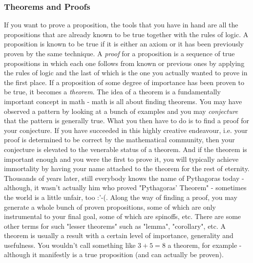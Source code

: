 \subsubsection{Theorems and Proofs}
If you want to prove a proposition, the tools that you have in hand are all the propositions that are already known to be true together with the rules of logic. A proposition is known to be true if it is either an axiom or it has been previously proven by the same technique. A \emph{proof} for a proposition is a sequence of true propositions in which each one follows from known or previous ones by applying the rules of logic and the last of which is the one you actually wanted to prove in the first place. If a proposition of some degree of importance has been proven to be true, it becomes a \emph{theorem}. The idea of a theorem is a fundamentally important concept in math - math is all about finding theorems. You may have observed a pattern by looking at a bunch of examples and you may \emph{conjecture} that the pattern is generally true. What you then have to do is to find a proof for your conjecture. If you have succeeded in this highly creative endeavour, i.e. your proof is determined to be correct by the mathematical community, then your conjecture is elevated to the venerable status of a theorem. And if the theorem is important enough and you were the first to prove it, you will typically achieve immortality by having your name attached to the theorem for the rest of eternity. Thousands of years later, still everybody knows the name of Pythagoras today - although, it wasn't actually him who proved "Pythagoras' Theorem" - sometimes the world is a little unfair, too :'-(. Along the way of finding a proof, you may generate a whole bunch of proven propositions, some of which are only instrumental to your final goal, some of which are spinoffs, etc. There are some other terms for such "lesser theorems" such as "lemma", "corollary", etc. A theorem is usually a result with a certain level of importance, generality and usefulness. You wouldn't call something like $3+5=8$ a theorem, for example - although it manifestly is a true proposition (and can actually be proven).

